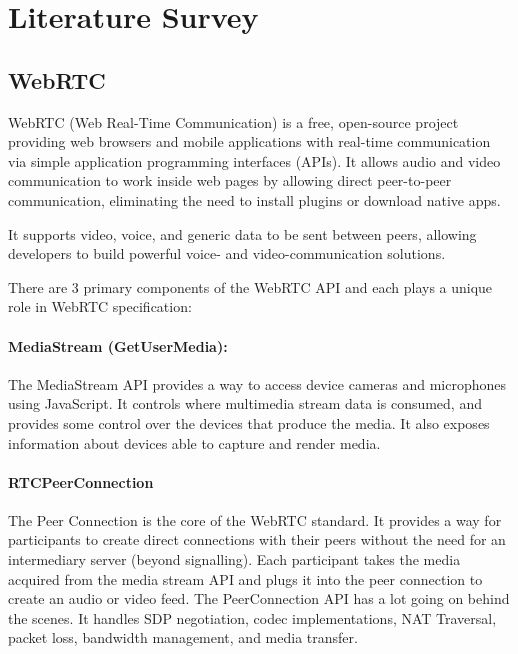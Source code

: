 \chapter{Literature Survey}


\section{WebRTC}

WebRTC (Web Real-Time Communication) is a free, open-source project providing web browsers and 
mobile applications with real-time communication via simple application programming interfaces (APIs). 
It allows audio and video communication to work inside web pages by allowing direct peer-to-peer communication, 
eliminating the need to install plugins or download native apps.

It supports video, voice, and generic data to be sent between peers, allowing developers 
to build powerful voice- and video-communication solutions. 
 
There are 3 primary components of the WebRTC API and each plays a unique role in WebRTC specification:

\subsubsection{MediaStream (GetUserMedia):}

The MediaStream API provides a way to access device cameras and microphones using JavaScript. 
It controls where multimedia stream data is consumed, and provides some control over the devices 
that produce the media. It also exposes information about devices able to capture and render media.

\subsubsection{RTCPeerConnection}

The Peer Connection is the core of the WebRTC standard. It provides a way for participants to 
create direct connections with their peers without the need for an intermediary 
server (beyond signalling). Each participant takes the media acquired from the media 
stream API and plugs it into the peer connection to create an audio or video feed.  
The PeerConnection API has a lot going on behind the scenes. It handles SDP negotiation, 
codec implementations, NAT Traversal, packet loss, bandwidth management, and media transfer.


